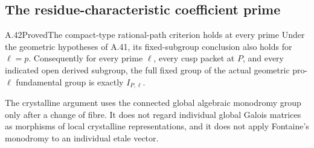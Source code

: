 \subsection{The residue-characteristic coefficient prime}

\begin{statement}{A.42}{Proved}{The compact-type rational-path criterion holds at every prime}
Under the geometric hypotheses of A.41, its fixed-subgroup
conclusion also holds for \(\ell=p\). Consequently for
every prime \(\ell\), every cusp packet at \(P\), and
every indicated open derived subgroup, the full fixed group
of the actual geometric pro-\(\ell\) fundamental group
is exactly \(I_{P,\ell}\).

The crystalline argument uses the connected global algebraic
monodromy group only after a change of fibre. It does not
regard individual global Galois matrices as morphisms of
local crystalline representations, and it does not apply
Fontaine's monodromy to an individual etale vector.
\end{statement}

